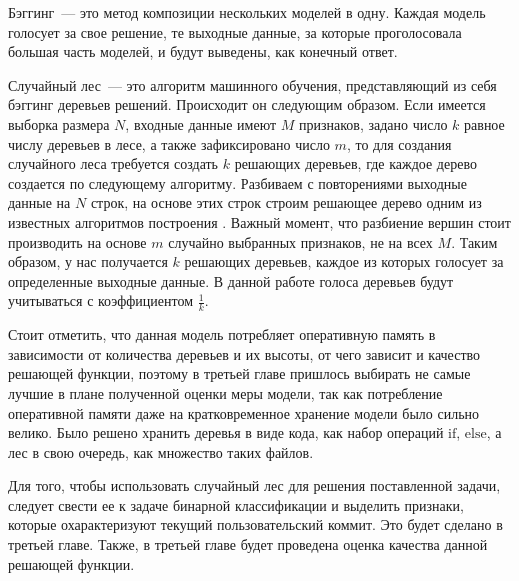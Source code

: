 Бэггинг~--- это метод композиции нескольких моделей в одну. Каждая модель голосует за свое решение, те выходные данные, за которые проголосовала большая часть моделей, и будут выведены, как конечный ответ.

Случайный лес~--- это алгоритм машинного обучения, представляющий из себя бэггинг деревьев решений. Происходит он следующим образом. Если имеется выборка размера $N$, входные данные имеют $M$ признаков, задано число $k$ равное числу деревьев в лесе, а также зафиксировано число $m$, то для создания случайного леса требуется создать $k$ решающих деревьев, где каждое дерево создается по следующему алгоритму. Разбиваем с повторениями выходные данные на $N$ строк, на основе этих строк строим решающее дерево одним из известных алгоритмов построения \cite{decision-tree}. Важный момент, что разбиение вершин стоит производить на основе $m$ случайно выбранных признаков, не на всех $M$. Таким образом, у нас получается $k$ решающих деревьев, каждое из которых голосует за определенные выходные данные. В данной работе голоса деревьев будут учитываться с коэффициентом $\frac{1}{k}$.

Стоит отметить, что данная модель потребляет оперативную память в зависимости от количества деревьев и их высоты, от чего зависит и качество решающей функции, поэтому в третьей главе пришлось выбирать не самые лучшие в плане полученной оценки меры модели, так как потребление оперативной памяти даже на кратковременное хранение модели было сильно велико. Было решено хранить деревья в виде кода, как набор операций $\text{if}$, $\text{else}$, а лес в свою очередь, как множество таких файлов.

Для того, чтобы использовать случайный лес для решения поставленной задачи, следует свести ее к задаче бинарной классификации и выделить признаки, которые охарактеризуют текущий пользовательский коммит. Это будет сделано в третьей главе. Также, в третьей главе будет проведена оценка качества данной решающей функции.

